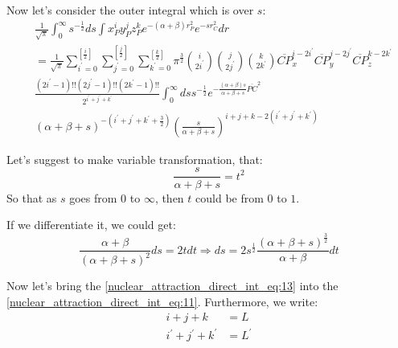 Now let's consider the outer integral which is over $s$:
\begin{equation}
\begin{split}
&\frac{1}{\sqrt{\pi}} 
 \int^{\infty}_{0} s^{-\frac{1}{2}} ds 
 \int x_{P}^{i}y_{P}^{j}z_{P}^{k} e^{-(\alpha+\beta)r_{P}^{2}}e^{-sr_{C}^{2}} dr \\
&= 
\frac{1}{\sqrt{\pi}}
\sum_{i^{'}=0}^{\left[ \frac{i}{2}\right]}
\sum_{j^{'}=0}^{\left[ \frac{j}{2}\right]}
\sum_{k^{'}=0}^{\left[ \frac{k}{2}\right]} 
\pi^{\frac{3}{2}}\binom{i}{2i^{'}}\binom{j}{2j^{'}}\binom{k}{2k^{'}}
\overline{CP}_{x}^{i-2i^{'}}\overline{CP}_{y}^{j-2j^{'}}\overline{CP}_{z}^{k-2k^{'}} \\
&\frac{(2i^{'}-1)!!(2j^{'}-1)!!(2k^{'}-1)!!}{2^{i^{'}+j^{'}+k^{'}}} 
\int^{\infty}_{0} ds s^{-\frac{1}{2}}
e^{-\frac{(\alpha+\beta)s}{\alpha+\beta + s} \overline{PC}^{2}} \\
&(\alpha+\beta+s)^{-\left( i^{'}+j^{'}+k^{'}+\frac{3}{2}\right) } 
\left( \frac{s}{\alpha+\beta+s}\right)^{i+j+k-2(i^{'}+j^{'}+k^{'})}
\end{split}
 \label{nuclear_attraction_direct_int_eq:11}
\end{equation}

Let's suggest to make variable transformation, that:
\begin{equation}
 \label{nuclear_attraction_direct_int_eq:12}
\frac{s}{\alpha+\beta + s} = t^{2}
\end{equation}
So that as $s$ goes from $0$ to $\infty$, then $t$ could be from $0$ to $1$.

If we differentiate it, we could get:
\begin{equation}
 \label{nuclear_attraction_direct_int_eq:13}
\frac{\alpha+\beta}{(\alpha+\beta + s)^{2}} ds = 2tdt \Rightarrow ds = 
2s^{\frac{1}{2}}\frac{(\alpha+\beta + s)^{\frac{3}{2}}}{\alpha+\beta} dt
\end{equation}

Now let's bring the \ref{nuclear_attraction_direct_int_eq:13} into the 
\ref{nuclear_attraction_direct_int_eq:11}. Furthermore, we write:
\begin{equation}
 \begin{split}
  i+j+k             &= L \\
  i^{'}+j^{'}+k^{'} &= L^{'}
 \end{split}
\end{equation}

